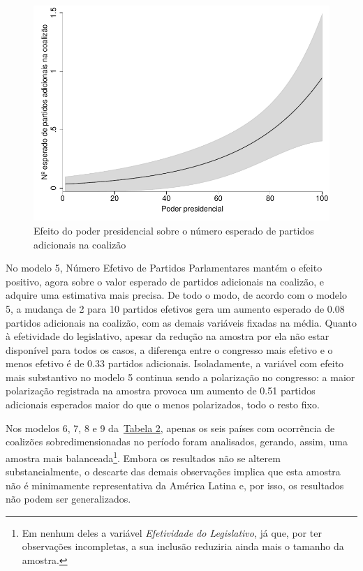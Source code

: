 \begin{figure}[htb]
	\label{fig:figura3}
	\caption{Efeito do poder presidencial sobre o número esperado de partidos adicionais na coalizão}
	\begin{center}
	    \includegraphics[scale=1]{negretto.pdf}
	\end{center}
\end{figure}


No modelo 5, Número Efetivo de Partidos Parlamentares mantém o efeito positivo, agora sobre o valor esperado de partidos adicionais na coalizão, e adquire uma estimativa mais precisa. De todo o modo, de acordo com o modelo 5, a mudança de 2 para 10 partidos efetivos gera um aumento esperado de 0.08 partidos adicionais na coalizão, com as demais variáveis fixadas na média. Quanto à efetividade do legislativo, apesar da redução na amostra por ela não estar disponível para todos os casos, a diferença entre o congresso mais efetivo e o menos efetivo é de 0.33 partidos adicionais. Isoladamente, a variável com efeito mais substantivo no modelo 5 continua sendo a polarização no congresso: a maior polarização registrada na amostra provoca um aumento de 0.51 partidos adicionais esperados maior do que o menos polarizados, todo o resto fixo.

Nos modelos 6, 7, 8 e 9 da~\hyperref[table:tabela2]{Tabela 2}, apenas os seis países com ocorrência de coalizões sobredimensionadas no período foram analisados, gerando, assim, uma amostra mais balanceada\footnote{Em nenhum deles a variável \textit{Efetividade do Legislativo}, já que, por ter observações incompletas, a sua inclusão reduziria ainda mais o tamanho da amostra.}. Embora os resultados não se alterem substancialmente, o descarte das demais observações implica que esta amostra não é minimamente representativa da América Latina e, por isso, os resultados não podem ser generalizados. 

